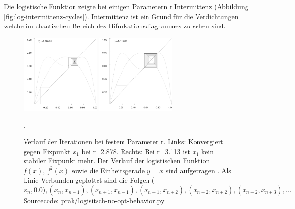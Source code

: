 \documentclass[11,5pt, twoside]{article}
\begin{document}
Die logistische Funktion zeigte bei einigen Parametern r Intermittenz (Abbildung \ref{fig:log-intermittenz-cycles}). Intermittenz ist ein Grund für die Verdichtungen welche im chaotischen Bereich des Bifurkationsdiagrammes zu sehen sind.

\begin{figure}[!htbp]
\centering
\includegraphics[height=150px]{fixpunkt-2878}
\includegraphics[height=150px]{fixpunkt-311}
\caption{Verlauf der Iterationen bei festem Parameter r. Links: Konvergiert gegen Fixpunkt $x_1$ bei r=2.878. Rechts: Bei r=3.113 ist $x_1$ kein stabiler Fixpunkt mehr. Der Verlauf der logistischen Funktion $f(x)$, $f^2(x)$ sowie die Einheitsgerade $y=x$ sind aufgetragen . Als Linie Verbunden geplottet sind die Folgen ($x_n, 0.0), (x_n, x_{n+1}), (x_{n+1}, x_{n+1}), (x_{n+1}, x_{n+2}), (x_{n+2}, x_{n+2}), (x_{n+2}, x_{n+3}), ...$ Sourcecode: prak/logisitsch-no-opt-behavior.py}. 
\label{fig:log-iteration-behavior}
\end{figure}
\end{document}
